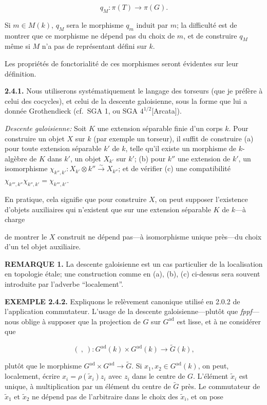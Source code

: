 \documentclass[10pt,a4paper]{article}
\newcommand{\SourcePage}[2]{\clearpage\setcounter{page}{#2}\typeout{D031_SOURCE_PAGE physical=#1 printed=#2}}
\begin{document}
\[
q_M:\pi(T)\longrightarrow\pi(G). \tag{2.4.0.2}
\]

Si \(m\in M(k)\), \(q_M\) sera le morphisme \(q_m\) induit par \(m\); la difficulté est de montrer que ce morphisme ne dépend pas du choix de \(m\), et de construire \(q_M\) même si \(M\) n'a pas de représentant défini sur \(k\).

Les propriétés de fonctorialité de ces morphismes seront évidentes sur leur définition.

\textbf{2.4.1.} Nous utiliserons systématiquement le langage des torseurs (que je préfère à celui des cocycles), et celui de la descente galoisienne, sous la forme que lui a donnée Grothendieck (cf.~SGA 1, ou SGA \(4^{1/2}\){[}Arcata{]}).

\emph{Descente galoisienne:} Soit \(K\) une extension séparable finie d'un corps \(k\). Pour construire un objet \(X\) sur \(k\) (par exemple un torseur), il suffit de construire (a) pour toute extension séparable \(k'\) de \(k\), telle qu'il existe un morphisme de \(k\)-algèbre de \(K\) dans \(k'\), un objet \(X_{k'}\) sur \(k'\); (b) pour \(k''\) une extension de \(k'\), un isomorphisme \(\chi_{k'',k'}:X_{k'}\otimes k''\xrightarrow{\sim}X_{k''}\); et de vérifier (c) une compatibilité \(\chi_{k''',k''}\chi_{k'',k'}=\chi_{k''',k'}\).

En pratique, cela signifie que pour construire \(X\), on peut supposer l'existence d'objets auxiliaires qui n'existent que sur une extension séparable \(K\) de \(k\)---à charge

\SourcePage{29}{275}
de montrer le \(X\) construit ne dépend pas---à isomorphisme unique près---du choix d'un tel objet auxiliaire.

\textbf{REMARQUE 1.} La descente galoisienne est un cas particulier de la localisation en topologie étale; une construction comme en (a), (b), (c) ci-dessus sera souvent introduite par l'adverbe ``localement''.

\textbf{EXEMPLE 2.4.2.} Expliquons le relèvement canonique utilisé en 2.0.2 de l'application commutateur. L'usage de la descente galoisienne---plutôt que \emph{fppf}---nous oblige à supposer que la projection de \(G\) sur \(G^{\mathrm{ad}}\) est lisse, et à ne considérer que

\[
(\ ,\ ):G^{\mathrm{ad}}(k)\times G^{\mathrm{ad}}(k)\longrightarrow\widetilde G(k),
\]

plutôt que le morphisme \(G^{\mathrm{ad}}\times G^{\mathrm{ad}}\to\widetilde G\). Si \(x_1,x_2\in G^{\mathrm{ad}}(k)\), on peut, localement, écrire \(x_i=\rho(\widetilde x_i)z_i\) avec \(z_i\) dans le centre de \(G\). L'élément \(\widetilde x_i\) est unique, à multiplication par un élément du centre de \(\widetilde G\) près. Le commutateur de \(\widetilde x_1\) et \(\widetilde x_2\) ne dépend pas de l'arbitraire dans le choix des \(\widetilde x_i\), et on pose
\end{document}
